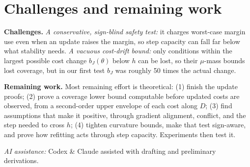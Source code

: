 \documentclass{l4dc2026}
\begin{document}
\section{Challenges and remaining work}
\textbf{Challenges.}
\emph{A conservative, sign-blind safety test:} it charges worst-case margin use even when an
update raises the margin, so step capacity can fall far below what stability needs.
\emph{A vacuous cost-drift bound:} only conditions within the largest possible cost change
$b_J(\theta)$ below $h$ can be lost, so their $\mu$-mass bounds lost coverage, but in our first
test $b_J$ was roughly 50 times the actual change.

\textbf{Remaining work.}
Most remaining effort is theoretical: (1) finish the update proofs; (2) prove a
coverage lower bound computable before updated costs are observed, from a second-order
upper envelope of each cost along $D$; (3) find assumptions that make it positive, through
gradient alignment, conflict, and the step needed to cross $h$; (4) tighten curvature
bounds, make that test sign-aware, and prove how refitting acts through
step capacity. Experiments then test it.

\noindent\textit{AI assistance:} Codex \& Claude assisted with drafting and preliminary derivations.
\label{midterm_body_end}

\clearpage
\label{midterm_references_start}

\end{document}
